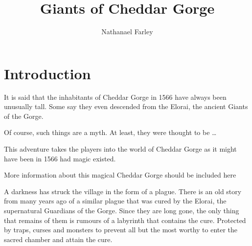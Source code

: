 \documentclass[twocolumn]{memoir}
\title{Giants of Cheddar Gorge}
\author{Nathanael Farley}
\newenvironment{firstperson}{%
}{%
}
\begin{document}
\RaggedRight
\maketitle

\section{Introduction}
\begin{firstperson}
It is said that the inhabitants of Cheddar Gorge in 1566 have always been unusually tall. Some say they even descended from the Elorai, the ancient Giants of the Gorge. 

Of course, such things are a myth. At least, they were thought to be \ldots
\end{firstperson}

This adventure takes the players into the world of Cheddar Gorge as it might have been in 1566 had magic existed. 

\begin{commentbox}
More information about this magical Cheddar Gorge should be included here
\end{commentbox}

A darkness has struck the village in the form of a plague. There is an old story from many years ago of a similar plague that was cured by the Elorai, the supernatural Guardians of the Gorge. Since they are long gone, the only thing that remains of them is rumours of a labyrinth that contains the cure. Protected by traps, curses and monsters to prevent all but the most worthy to enter the sacred chamber and attain the cure.
\end{document}
